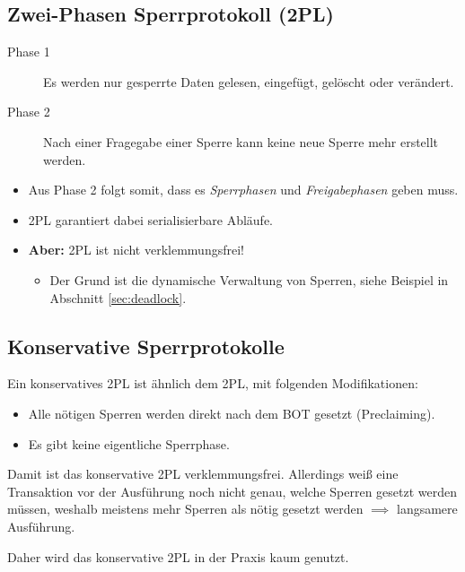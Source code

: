 \documentclass[a4paper, 11pt, accentcolor = tud3b]{tudreport}
\begin{document}
            \subsection{Zwei-Phasen Sperrprotokoll (2PL)} %
                \begin{description}
                	\item[Phase 1] Es werden nur gesperrte Daten gelesen, eingefügt, gelöscht oder verändert.
                	\item[Phase 2] Nach einer Fragegabe einer Sperre kann keine neue Sperre mehr erstellt werden.
                \end{description}
	            \begin{itemize}
	            	\item Aus Phase 2 folgt somit, dass es \textit{Sperrphasen} und \textit{Freigabephasen} geben muss.
	            	\item 2PL garantiert dabei serialisierbare Abläufe.
	            	\item \textbf{Aber:} 2PL ist nicht verklemmungsfrei!
	            		\begin{itemize}
	            			\item Der Grund ist die dynamische Verwaltung von Sperren, siehe Beispiel in Abschnitt \ref{sec:deadlock}.
	            		\end{itemize}
	            \end{itemize}

            \subsection{Konservative Sperrprotokolle} %
            	Ein konservatives 2PL ist ähnlich dem 2PL, mit folgenden Modifikationen:
                \begin{itemize}
                	\item Alle nötigen Sperren werden direkt nach dem BOT gesetzt (Preclaiming).
                	\item Es gibt keine eigentliche Sperrphase.
                \end{itemize}
            
            	Damit ist das konservative 2PL verklemmungsfrei. Allerdings weiß eine Transaktion vor der Ausführung noch nicht genau, welche Sperren gesetzt werden müssen, weshalb meistens mehr Sperren als nötig gesetzt werden \( \implies \) langsamere Ausführung.
            	
            	Daher wird das konservative 2PL in der Praxis kaum genutzt.
\end{document}
